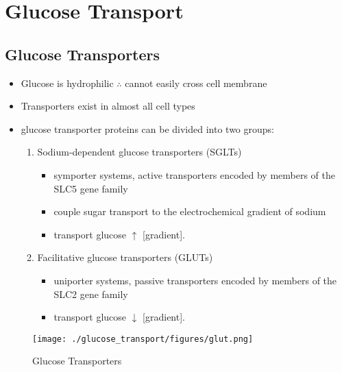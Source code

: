 \documentclass{scrartcl}
\begin{document}
\section{Glucose Transport}
\label{sec:orgadea20c}
\subsection{Glucose Transporters}
\label{sec:orgf6a5dcc}
\begin{itemize}
\item Glucose is hydrophilic \(\therefore\) cannot easily cross cell membrane
\item Transporters exist in almost all cell types
\item glucose transporter proteins can be divided into two groups:
\begin{enumerate}
\item Sodium-dependent glucose transporters (SGLTs)
\begin{itemize}
\item symporter systems, active transporters encoded by members of
the SLC5 gene family
\item couple sugar transport to the electrochemical gradient of sodium
\item transport glucose \(\uparrow\) [gradient].
\end{itemize}
\item Facilitative glucose transporters (GLUTs)
\begin{itemize}
\item uniporter systems, passive transporters encoded by members of the SLC2 gene family
\item transport glucose \(\downarrow\) [gradient].
\end{itemize}
\end{enumerate}
\end{itemize}

\begin{figure}[htbp]
\centering
\texttt{[image: ./glucose\_transport/figures/glut.png]}
\caption[glucose transporters]{\label{fig:orgf4fb715}
Glucose Transporters}
\end{figure}
\end{document}
